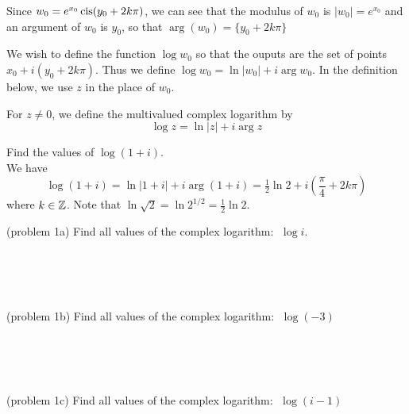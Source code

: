 \documentclass[handout]{ximera}
\begin{document}
Since $w_0 = e^{x_0}\operatorname{cis}(y_0 + 2k\pi)$, we can see that the modulus of $w_0$ is $|w_0| = e^{x_0}$ and an 
argument of $w_0$ is $y_0$, so that $\arg(w_0) = \{y_0 + 2k\pi\}$

We wish to define the function $\log w_0$ so that the ouputs are the set of points $x_0 + i(y_0 + 2k\pi)$.  
Thus we define $\log w_0 = \ln|w_0| +i \arg w_0$. 
In the definition below, we use $z$ in the place of $w_0$.
\begin{definition}
For $z \neq 0$, we define the multivalued complex logarithm by
\[
\log z = \ln |z| + i \arg z
\]
\end{definition}

\begin{example}[example 1]
Find the values of $\log(1+i)$.\\
We have 
\[
\log(1+i) = \ln |1+i| + i \arg(1+i) = \tfrac12\ln 2 + i\left(\frac{\pi}{4} + 2k\pi\right)
\]
where $k \in \mathbb Z$. Note that $\ln \sqrt 2 = \ln 2^{1/2} = \frac12\ln 2$.
\end{example}

\begin{problem}(problem 1a)
Find all values of the complex logarithm: $\; \log i$.\\
\begin{multipleChoice}
\\
\\
\\
\end{multipleChoice}
\end{problem}


\begin{problem}(problem 1b)
Find all values of the complex logarithm: $\; \log(-3)$\\
\begin{multipleChoice}
\\
\\
\\
\end{multipleChoice}
\end{problem}


\begin{problem}(problem 1c)
Find all values of the complex logarithm: $\; \log(i-1)$\\
\begin{multipleChoice}
\\
\\
\\
\end{multipleChoice}
\end{problem}
\end{document}
